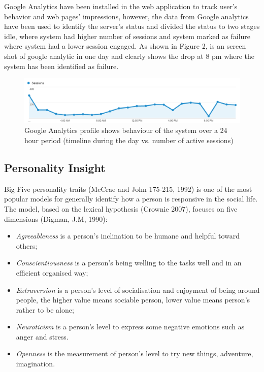 \documentclass[graybox]{svmult}
\begin{document}
Google Analytics have been installed in the web application to track
user’s behavior and web pages’ impressions, however, the data from
Google analytics have been used to identify the server’s status and
divided the status to two stages idle, where system had higher number
of sessions and system marked as failure where system had a lower
session engaged. As shown in Figure 2, is an screen shot of google
analytic in one day and clearly shows the drop at 8 pm where the
system has been identified as failure.

\begin{figure}[!ht]
\centering
\includegraphics[width=\columnwidth]{images/googleanalytics}
\caption{Google Analytics profile shows behaviour of the system over a
  24 hour period (timeline during the day vs. number of active sessions)}
\label{fig:googleanalytics} 
\end{figure}

\subsection{Personality Insight}

Big Five personality traits (McCrae and John 175-215, 1992) is one of
the most popular models for generally identify how a person is
responsive in the social life. The model, based on the lexical
hypothesis (Crownie 2007), focuses on five dimensions (Digman, J.M,
1990):

\begin{itemize}
\item {\emph{Agreeableness}} is a person's inclination to be humane
  and helpful toward others;
\item {\emph{Conscientiousness}} is a person's being welling to the
  tasks well and in an efficient organised way;
\item {\emph{Extraversion}} is a person's level of socialisation and
  enjoyment of being around people, the higher value means sociable
  person, lower value means person's rather to be alone;
\item {\emph{Neuroticism}} is a person's level to express some
  negative emotions such as anger and stress.
\item {\emph{Openness}} is the measurement of person's level to try
  new things, adventure, imagination.
\end{itemize}
\end{document}
